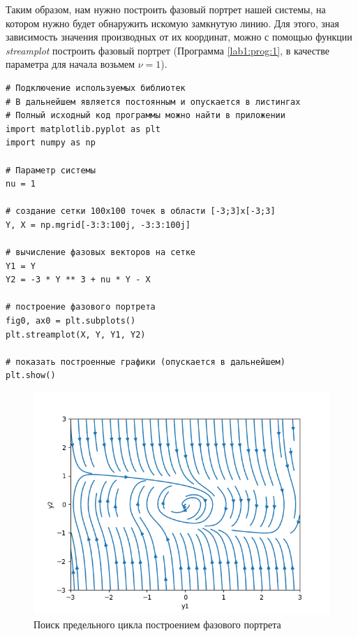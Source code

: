 Таким образом, нам нужно построить фазовый портрет нашей системы, на котором
нужно будет обнаружить искомую замкнутую линию. Для этого, зная зависимость
значения производных от их координат, можно с помощью функции
\textit{streamplot}\cite{streamplot} построить фазовый портрет (Программа
\ref{lab1:prog:1}, в качестве параметра для начала возьмем $\nu = 1$).

\begin{program}
  \caption{Построение фазового портрета}
  \label{lab1:prog:1}
  \begin{verbatim}
# Подключение используемых библиотек
# В дальнейшем является постоянным и опускается в листингах
# Полный исходный код программы можно найти в приложении
import matplotlib.pyplot as plt
import numpy as np

# Параметр системы
nu = 1

# создание сетки 100х100 точек в области [-3;3]x[-3;3]
Y, X = np.mgrid[-3:3:100j, -3:3:100j]

# вычисление фазовых векторов на сетке
Y1 = Y
Y2 = -3 * Y ** 3 + nu * Y - X

# построение фазового портрета
fig0, ax0 = plt.subplots()
plt.streamplot(X, Y, Y1, Y2)

# показать построенные графики (опускается в дальнейшем)
plt.show()
  \end{verbatim}
\end{program}
\clearpage


\begin{figure}[thp]
  \centering
  \includegraphics[width=\textwidth]{figures/1_streamplot}
  \caption{Поиск предельного цикла построением фазового портрета}
  \label{lab1:streamplot}
\end{figure}

